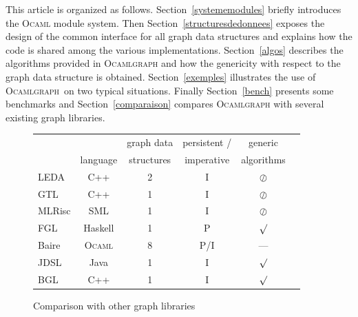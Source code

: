 \documentclass[tfpsymp]{tfp05symp}
\newcommand{\ocamlgraph}{\textsc{Ocamlgraph}\xspace}
\newcommand{\ocaml}{\textsc{Ocaml}\xspace}
\begin{document}
This article is organized as follows. Section~\ref{systememodules}
briefly introduces the \ocaml module system. Then
Section~\ref{structuresdedonnees} exposes the design of the common
interface for all graph data structures and explains how the code is
shared among the various implementations. Section~\ref{algos}
describes the algorithms provided in \ocamlgraph and how the
genericity with respect to the graph data structure is obtained.
Section~\ref{exemples} illustrates the use of \ocamlgraph\ on two
typical situations.  Finally Section~\ref{bench} presents some
benchmarks and Section~\ref{comparaison} compares \ocamlgraph with
several existing graph libraries.



\begin{figure}[t]
\newcommand{\present}{\large\boldmath $\surd$}
\newcommand{\absent}{\large\boldmath $\oslash$}

  \centering
  \begin{tabular}{|l||c|c|c|c|c|}
    \hline
     &          & graph data & persistent / & generic    \\
     & language & structures & imperative   & algorithms \\\hline\hline
     LEDA & C++    & 2  & I & \absent   \\\hline
     GTL & C++     & 1  & I & \absent   \\\hline
     MLRisc & SML  & 1  & I & \absent   \\\hline
     FGL & Haskell & 1  & P & \present  \\\hline
     Baire & \ocaml & 8 &P/I& ---      \\\hline
     JDSL & Java   & 1  & I & \present  \\\hline
     BGL & C++     & 1  & I & \present  \\\hline
  \end{tabular}
  \medskip
  \caption{Comparison with other graph libraries}
  \label{comparison:tab}
\end{figure}
\end{document}
